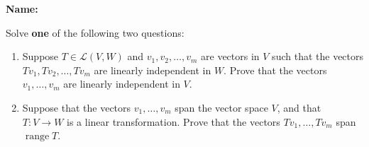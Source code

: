\documentclass[12pt]{article}
\begin{document}
\thispagestyle{fancy}
{\bf Name:}

\bigskip

Solve {\bf one} of the following two questions:
 \begin{enumerate}
 \item  Suppose $T\in\mathcal{L}(V,W)$ and $v_1,v_2,\ldots, v_m$ are vectors in $V$ such that the vectors $Tv_1,Tv_2,\ldots, Tv_m$ are linearly independent in $W$. Prove that the vectors $v_1,\ldots, v_m$ are linearly independent in $V$. 

\item Suppose that the vectors $v_1,\ldots, v_m$ span the vector space $V$, and that $T:V\to W$ is a linear transformation. Prove that the vectors $Tv_1,\ldots, Tv_m$ span $\operatorname{range}T$.
 \end{enumerate}
\end{document}
